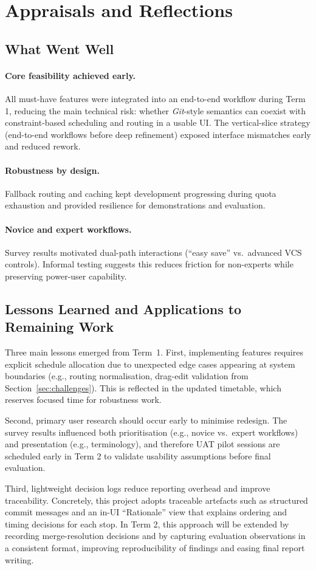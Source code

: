 \section{Appraisals and Reflections}
\label{sec:reflections}

\subsection{What Went Well}
\paragraph{Core feasibility achieved early.}
All must-have features were integrated into an end-to-end workflow during Term 1, reducing the main technical risk: whether \textit{Git}-style semantics can coexist with constraint-based scheduling and routing in a usable UI. The vertical-slice strategy (end-to-end workflows before deep refinement) exposed interface mismatches early and reduced rework.

\paragraph{Robustness by design.}
Fallback routing and caching kept development progressing during quota exhaustion and provided resilience for demonstrations and evaluation.

\paragraph{Novice and expert workflows.}
Survey results motivated dual-path interactions (``easy save'' vs.\ advanced VCS controls). Informal testing suggests this reduces friction for non-experts while preserving power-user capability.

\subsection{Lessons Learned and Applications to Remaining Work}

Three main lessons emerged from Term~1. First, implementing features requires explicit schedule allocation due to unexpected edge cases appearing at system boundaries (e.g., routing normalisation, drag-edit validation from Section~\ref{sec:challenges}). This is reflected in the updated timetable, which reserves focused time for robustness work.

Second, primary user research should occur early to minimise redesign. The survey results influenced both prioritisation (e.g., novice vs.\ expert workflows) and presentation (e.g., terminology), and therefore UAT pilot sessions are scheduled early in Term 2 to validate usability assumptions before final evaluation.

Third, lightweight decision logs reduce reporting overhead and improve traceability. Concretely, this project adopts traceable artefacts such as structured commit messages and an in-UI ``Rationale'' view that explains ordering and timing decisions for each stop. In Term 2, this approach will be extended by recording merge-resolution decisions and by capturing evaluation observations in a consistent format, improving reproducibility of findings and easing final report writing.
